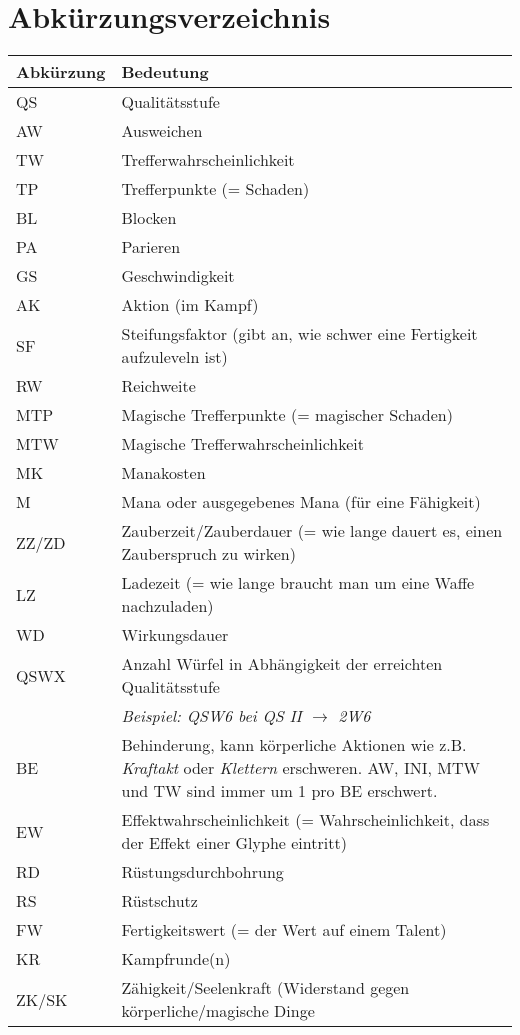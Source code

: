 \chapter{Abkürzungsverzeichnis}
\begin{longtable}{|p{}|p{}|}
\hline
\textbf{Abkürzung} & \textbf{Bedeutung} \\ \hline
QS & Qualitätsstufe \\ \hline
AW & Ausweichen \\ \hline
TW & Trefferwahrscheinlichkeit \\ \hline
TP & Trefferpunkte (= Schaden) \\ \hline
BL & Blocken \\ \hline
PA & Parieren \\ \hline
GS & Geschwindigkeit \\ \hline
AK & Aktion (im Kampf) \\ \hline
SF & Steifungsfaktor (gibt an, wie schwer eine Fertigkeit aufzuleveln ist) \\ \hline
RW & Reichweite \\ \hline
MTP & Magische Trefferpunkte (= magischer Schaden) \\ \hline
MTW & Magische Trefferwahrscheinlichkeit \\ \hline
MK & Manakosten \\ \hline
M & Mana oder ausgegebenes Mana (für eine Fähigkeit) \\ \hline
ZZ/ZD & Zauberzeit/Zauberdauer (= wie lange dauert es, einen Zauberspruch zu wirken) \\ \hline
LZ & Ladezeit (= wie lange braucht man um eine Waffe nachzuladen) \\ \hline
WD & Wirkungsdauer \\ \hline
QSWX & Anzahl Würfel in Abhängigkeit der erreichten Qualitätsstufe \\
& \textit{Beispiel: QSW6 bei QS II $\rightarrow$ 2W6} \\ \hline
BE & Behinderung, kann körperliche Aktionen wie z.B. \textit{Kraftakt} oder \textit{Klettern} erschweren. AW, INI, MTW und TW sind immer um 1 pro BE erschwert. \\ \hline
EW & Effektwahrscheinlichkeit (= Wahrscheinlichkeit, dass der Effekt einer Glyphe eintritt) \\ \hline
RD & Rüstungsdurchbohrung \\ \hline
RS & Rüstschutz \\ \hline
FW & Fertigkeitswert (= der Wert auf einem Talent) \\ \hline
KR & Kampfrunde(n) \\ \hline
ZK/SK & Zähigkeit/Seelenkraft (Widerstand gegen körperliche/magische Dinge \\ \hline
\end{longtable}
